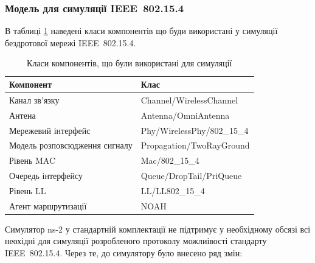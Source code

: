 \documentclass[a4paper,ukrainian,utf8,nocolumnsxix,floatsection]{eskdtext}
\renewcommand\paragraph{\subsubsection}
\newcommand{\iee}[0]{IEEE~802.15.4\xspace}
\begin{document}
\paragraph{Модель для симуляції \iee}

В таблиці \ref{tbl:simulation_classes} наведені класи компонентів що буди використані у симуляції бездротової мережі \iee.

\begin{table}[htbp]
\caption{Класи компонентів, що були використані для симуляції}
\centering
\begin{tabular}{|l|l|}
\hline
Компонент                     & Клас                       \\ \hline
Канал зв’язку                 & Channel/WirelessChannel    \\ \hline
Антена                        & Antenna/OmniAntenna        \\ \hline
Мережевий інтерфейс           & Phy/WirelessPhy/802\_15\_4 \\ \hline
Модель розповсюдження сигналу & Propagation/TwoRayGround   \\ \hline
Рівень MAC                    & Mac/802\_15\_4             \\ \hline
Очередь інтерфейсу            & Queue/DropTail/PriQueue    \\ \hline
Рівень LL                     & LL/LL802\_15\_4            \\ \hline
Агент маршрутизації           & NOAH                       \\ \hline
\end{tabular}
\label{tbl:simulation_classes}
\end{table}

Симулятор ns-2 у стандартній комплектації не підтримує у необхідному обсязі всі неохідні для симуляції розробленого протоколу можлиівості стандарту \iee. Через те, до симулятору було внесено ряд змін:
\end{document}
